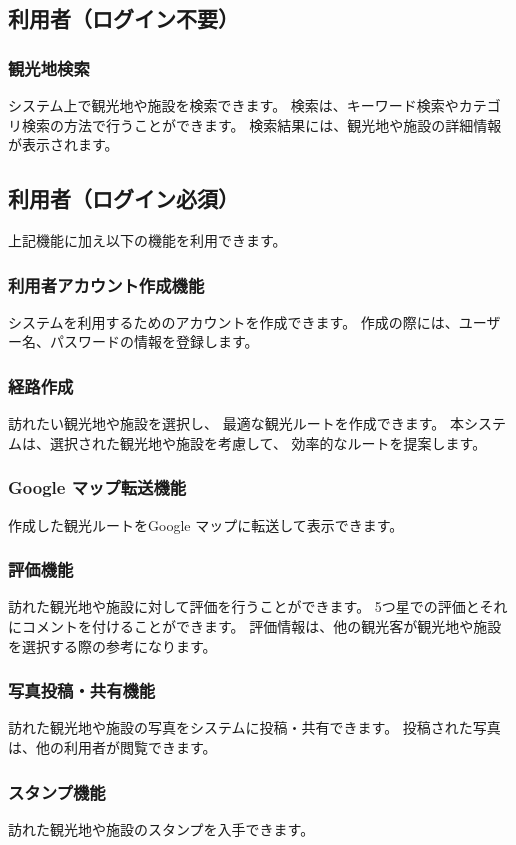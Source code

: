 \documentclass{docs}
\begin{document}
\subsection{利用者（ログイン不要）}
\subsubsection{観光地検索}
システム上で観光地や施設を検索できます。
検索は、キーワード検索やカテゴリ検索の方法で行うことができます。
検索結果には、観光地や施設の詳細情報が表示されます。

\subsection{利用者（ログイン必須）}
上記機能に加え以下の機能を利用できます。
\subsubsection{利用者アカウント作成機能}
システムを利用するためのアカウントを作成できます。
作成の際には、ユーザー名、パスワードの情報を登録します。

\subsubsection{経路作成}
訪れたい観光地や施設を選択し、
最適な観光ルートを作成できます。
本システムは、選択された観光地や施設を考慮して、
効率的なルートを提案します。

\subsubsection{Google マップ転送機能}
作成した観光ルートをGoogle マップに転送して表示できます。

\subsubsection{評価機能}
訪れた観光地や施設に対して評価を行うことができます。
5つ星での評価とそれにコメントを付けることができます。
評価情報は、他の観光客が観光地や施設を選択する際の参考になります。

\subsubsection{写真投稿・共有機能}
訪れた観光地や施設の写真をシステムに投稿・共有できます。
投稿された写真は、他の利用者が閲覧できます。

\subsubsection{スタンプ機能}
訪れた観光地や施設のスタンプを入手できます。
\end{document}
